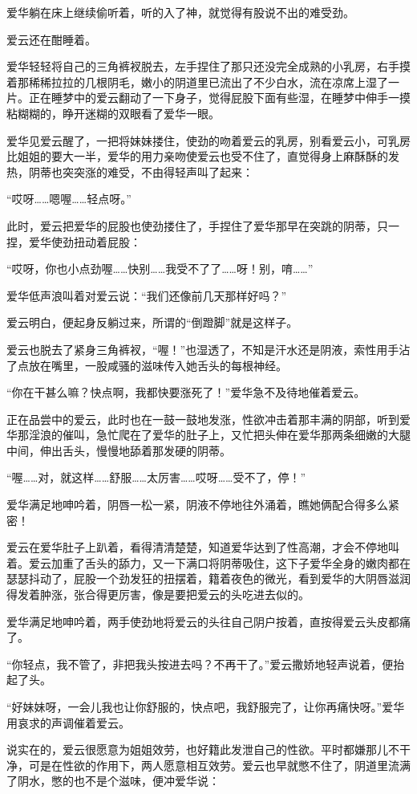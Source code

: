 \documentclass[12pt,UTF8]{ctexbook}
\begin{document}
爱华躺在床上继续偷听着，听的入了神，就觉得有股说不出的难受劲。

爱云还在酣睡着。

爱华轻轻将自己的三角裤衩脱去，左手捏住了那只还没完全成熟的小乳房，右手摸着那稀稀拉拉的几根阴毛，嫩小的阴道里已流出了不少白水，流在凉席上湿了一片。正在睡梦中的爱云翻动了一下身子，觉得屁股下面有些湿，在睡梦中伸手一摸粘糊糊的，睁开迷糊的双眼看了爱华一眼。

爱华见爱云醒了，一把将妹妹搂住，使劲的吻着爱云的乳房，别看爱云小，可乳房比姐姐的要大一半，爱华的用力亲吻使爱云也受不住了，直觉得身上麻酥酥的发热，阴蒂也突突涨的难受，不由得轻声叫了起来：

“哎呀……嗯喔……轻点呀。”

此时，爱云把爱华的屁股也使劲搂住了，手捏住了爱华那早在突跳的阴蒂，只一捏，爱华使劲扭动着屁股：

“哎呀，你也小点劲喔……快别……我受不了了……呀！别，唷……”

爱华低声浪叫着对爱云说：“我们还像前几天那样好吗？”

爱云明白，便起身反躺过来，所谓的“倒蹬脚”就是这样子。

爱云也脱去了紧身三角裤衩，“喔！”也湿透了，不知是汗水还是阴液，索性用手沾了点放在嘴里，一股咸骚的滋味传入她舌头的每根神经。

“你在干甚么嘛？快点啊，我都快要涨死了！”爱华急不及待地催着爱云。

正在品尝中的爱云，此时也在一鼓一鼓地发涨，性欲冲击着那丰满的阴部，听到爱华那淫浪的催叫，急忙爬在了爱华的肚子上，又忙把头伸在爱华那两条细嫩的大腿中间，伸出舌头，慢慢地舔着那发硬的阴蒂。

“喔……对，就这样……舒服……太厉害……哎呀……受不了，停！”

爱华满足地呻吟着，阴唇一松一紧，阴液不停地往外涌着，瞧她俩配合得多么紧密！

爱云在爱华肚子上趴着，看得清清楚楚，知道爱华达到了性高潮，才会不停地叫着。爱云加重了舌头的舔力，又一下满口将阴蒂吸住，这下子爱华全身的嫩肉都在瑟瑟抖动了，屁股一个劲发狂的扭摆着，籍着夜色的微光，看到爱华的大阴唇滋润得发着肿涨，张合得更厉害，像是要把爱云的头吃进去似的。

爱华满足地呻吟着，两手使劲地将爱云的头往自己阴户按着，直按得爱云头皮都痛了。

“你轻点，我不管了，非把我头按进去吗？不再干了。”爱云撒娇地轻声说着，便抬起了头。

“好妹妹呀，一会儿我也让你舒服的，快点吧，我舒服完了，让你再痛快呀。”爱华用哀求的声调催着爱云。

说实在的，爱云很愿意为姐姐效劳，也好籍此发泄自己的性欲。平时都嫌那儿不干净，可是在性欲的作用下，两人愿意相互效劳。爱云也早就憋不住了，阴道里流满了阴水，憋的也不是个滋味，便冲爱华说：
\end{document}
